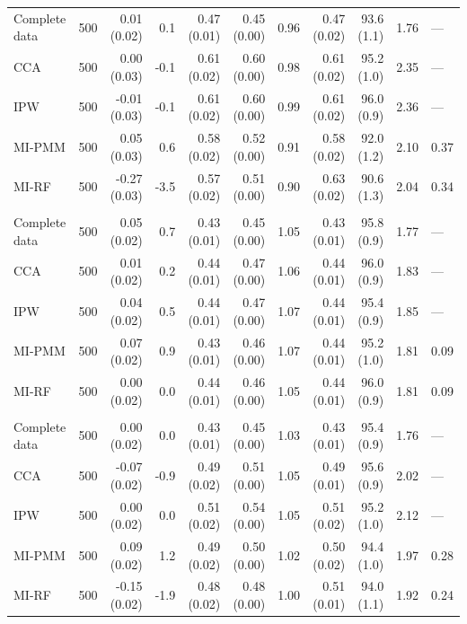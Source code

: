 \begin{longtable}{l|rrrrrrrrrl}
\midrule\addlinespace[2.5pt]
\multicolumn{11}{l}{Wasting — MCAR 50\%} \\[2.5pt] 
\midrule\addlinespace[2.5pt]
Complete data & 500 & 0.01 (0.02) & 0.1 & 0.47 (0.01) & 0.45 (0.00) & 0.96 & 0.47 (0.02) & 93.6 (1.1) & 1.76 & — \\ 
CCA & 500 & 0.00 (0.03) & -0.1 & 0.61 (0.02) & 0.60 (0.00) & 0.98 & 0.61 (0.02) & 95.2 (1.0) & 2.35 & — \\ 
IPW & 500 & -0.01 (0.03) & -0.1 & 0.61 (0.02) & 0.60 (0.00) & 0.99 & 0.61 (0.02) & 96.0 (0.9) & 2.36 & — \\ 
MI-PMM & 500 & 0.05 (0.03) & 0.6 & 0.58 (0.02) & 0.52 (0.00) & 0.91 & 0.58 (0.02) & 92.0 (1.2) & 2.10 & 0.37 \\ 
MI-RF & 500 & -0.27 (0.03) & -3.5 & 0.57 (0.02) & 0.51 (0.00) & 0.90 & 0.63 (0.02) & 90.6 (1.3) & 2.04 & 0.34 \\ 
\midrule\addlinespace[2.5pt]
\multicolumn{11}{l}{Wasting — MAR 10\%} \\[2.5pt] 
\midrule\addlinespace[2.5pt]
Complete data & 500 & 0.05 (0.02) & 0.7 & 0.43 (0.01) & 0.45 (0.00) & 1.05 & 0.43 (0.01) & 95.8 (0.9) & 1.77 & — \\ 
CCA & 500 & 0.01 (0.02) & 0.2 & 0.44 (0.01) & 0.47 (0.00) & 1.06 & 0.44 (0.01) & 96.0 (0.9) & 1.83 & — \\ 
IPW & 500 & 0.04 (0.02) & 0.5 & 0.44 (0.01) & 0.47 (0.00) & 1.07 & 0.44 (0.01) & 95.4 (0.9) & 1.85 & — \\ 
MI-PMM & 500 & 0.07 (0.02) & 0.9 & 0.43 (0.01) & 0.46 (0.00) & 1.07 & 0.44 (0.01) & 95.2 (1.0) & 1.81 & 0.09 \\ 
MI-RF & 500 & 0.00 (0.02) & 0.0 & 0.44 (0.01) & 0.46 (0.00) & 1.05 & 0.44 (0.01) & 96.0 (0.9) & 1.81 & 0.09 \\ 
\midrule\addlinespace[2.5pt]
\multicolumn{11}{l}{Wasting — MAR 30\%} \\[2.5pt] 
\midrule\addlinespace[2.5pt]
Complete data & 500 & 0.00 (0.02) & 0.0 & 0.43 (0.01) & 0.45 (0.00) & 1.03 & 0.43 (0.01) & 95.4 (0.9) & 1.76 & — \\ 
CCA & 500 & -0.07 (0.02) & -0.9 & 0.49 (0.02) & 0.51 (0.00) & 1.05 & 0.49 (0.01) & 95.6 (0.9) & 2.02 & — \\ 
IPW & 500 & 0.00 (0.02) & 0.0 & 0.51 (0.02) & 0.54 (0.00) & 1.05 & 0.51 (0.02) & 95.2 (1.0) & 2.12 & — \\ 
MI-PMM & 500 & 0.09 (0.02) & 1.2 & 0.49 (0.02) & 0.50 (0.00) & 1.02 & 0.50 (0.02) & 94.4 (1.0) & 1.97 & 0.28 \\ 
MI-RF & 500 & -0.15 (0.02) & -1.9 & 0.48 (0.02) & 0.48 (0.00) & 1.00 & 0.51 (0.01) & 94.0 (1.1) & 1.92 & 0.24 \\ 

\end{longtable}

